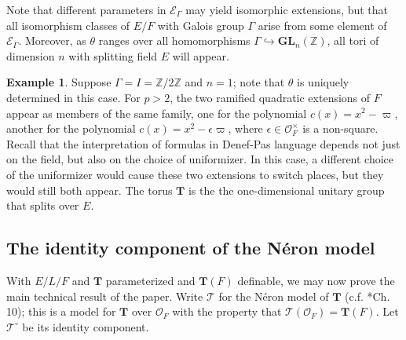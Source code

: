 \documentclass{amsart}
\newcommand{\Z}{{\mathbb Z}}
\newcommand{\ri}{\mathcal{O}}
\newcommand{\GL}{\mathbf {GL}}
\newcommand{\bT}{\mathbf {T}}
\newcommand\cE{{\mathcal E}}
\newcommand{\Ner}[1]{\mathcal{#1}}
\newcommand{\NerC}[1]{\mathcal{#1}^\circ}
\theoremstyle{plain}
\theoremstyle{definition}
\newtheorem{rem}[thm]{Remark}
\newtheorem{example}[thm]{Example}
\begin{document}
Note that different parameters in $\cE_\Gamma$ may yield isomorphic extensions, but that all isomorphism classes of $E/F$ with Galois group $\Gamma$
arise from some element of $\cE_\Gamma$.  Moreover, as $\theta$ ranges over all homomorphisms $\Gamma \hookrightarrow \GL_n(\Z)$, all tori of dimension $n$ with splitting field $E$ will appear.
\begin{example}
Suppose $\Gamma = I = \Z / 2\Z$ and $n=1$; note that $\theta$ is uniquely determined in this case.
For $p > 2$, the two ramified quadratic extensions of $F$ appear as members of the same family,
one for the polynomial $c(x) = x^2-\varpi$, another for the polynomial $c(x) = x^2-\epsilon\varpi$,
where $\epsilon \in \ri_F^\times$ is a non-square.
Recall that the interpretation of formulas in Denef-Pas language depends not just on the field,
but also on the choice of uniformizer. In this case, a different choice of the uniformizer
would cause these two extensions to switch places, but they would still both appear.
The torus $\bT$ is the the one-dimensional unitary group that splits over $E$.
\end{example}

\subsection{The identity component of the N\'eron model}

With $E/L/F$ and $\bT$ parameterized and $\bT(F)$ definable, we may now prove the main technical result of the paper.
Write $\Ner{T}$ for the N\'eron model of $\bT$ (c.f. \cite{bosch-lutkebohmert-raynaud:neron}*{Ch. 10}); this is a model for $\bT$ over $\ri_F$ with the property that $\Ner{T}(\ri_F) = \bT(F)$.  Let $\NerC{T}$ be its identity component.
\end{document}

